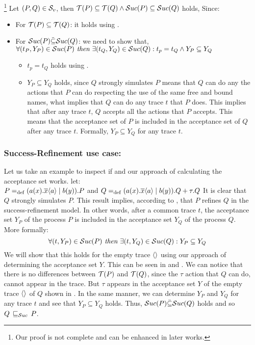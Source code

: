 \begin{prf}\footnote{Our proof is not complete and can be enhanced in later works.}
Let $(P,Q)\in{}\mathcal{S}_v$, then $\Traces[P]\subseteq\Traces[Q] \wedge \Successes[P]\subseteq\Successes[Q]$ holds, Since:
\begin{itemize}
\item For $\Traces[P]\subseteq\Traces[Q]$: it holds using .
\item For $\Successes[P]\ddot{\subseteq}\Successes[Q]$: we need to show that,\\$\forall (t_P, Y_P) \in \Successes[P] \textit{ then } \exists (t_Q, Y_Q) \in \Successes[Q]: t_p = t_Q \wedge Y_P \subseteq Y_Q$
\begin{itemize}
\item $t_p = t_Q$ holds using .
\item $Y_P \subseteq Y_Q$ holds, since $Q$ strongly simulates $P$ means that $Q$ can do any the actions that $P$ can do respecting the use of the same free and bound names, what implies that $Q$ can do any trace $t$ that $P$ does. This implies that after any trace $t$, $Q$ accepts all the actions that $P$ accepts. This means that the acceptance set of $P$ is included in the acceptance set of $Q$ after any trace $t$. Formally, $Y_P \subseteq Y_Q$ for any trace $t$.
\end{itemize}
\end{itemize}
\end{prf}
\subsubsection{Success-Refinement use case:}
Let us take an example to inspect if  and our approach of calculating the acceptance set works. let:\\
$P=_{\mathrm{def}}(a(x).\overline{x}\langle a\rangle \mid b(y)).P$ and 
$Q=_{\mathrm{def}}(a(x).\overline{x}\langle a\rangle \mid b(y)).Q + \tau.Q$
It is clear that $Q$ strongly simulates $P$. This result implies, according to , that $P$ refines $Q$ in the success-refinement model. In other words, after a common trace $t$, the acceptance set $Y_P$ of the process $P$ is included in the acceptance set $Y_Q$ of the process $Q$. More formally:
\[\forall (t, Y_P) \in \Successes[P] \textit{ then } \exists (t, Y_Q) \in \Successes[Q]: Y_P \subseteq Y_Q\]
We will show that this holds for the empty trace $\overline{}\langle\rangle$ using our approach of determining the acceptance set $Y$.
This can be seen in  and . We can notice that there is no differences between $\Traces[P]$ and $\Traces[Q]$, since the $\tau$ action that $Q$ can do, cannot appear in the trace. But $\tau$ appears in the acceptance set $Y$ of the empty trace $\overline{}\langle\rangle$ of $Q$ shown in . In the same manner, we can determine $Y_P$ and $Y_Q$ for any trace $t$ and see that $Y_P \subseteq Y_Q$ holds. Thus, $\Successes[P]\ddot{\subseteq}\Successes[Q]$ holds and so $Q \refiSuc P$.

